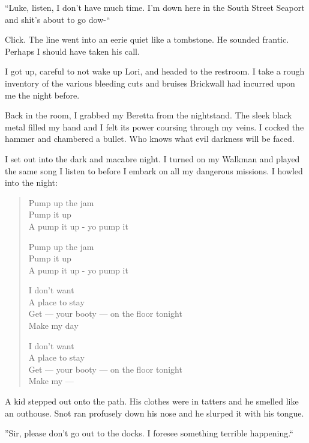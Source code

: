 ``Luke, listen, I don't have much time. I'm down
here in the South Street Seaport and shit's about to go
dow-``



Click. The line went into an eerie quiet like a tombstone. He
sounded frantic. Perhaps I should have taken his call.



I got up, careful to not wake up Lori, and headed to the restroom.
I take a rough inventory of the various bleeding cuts and bruises
Brickwall had incurred upon me the night before.



Back in the room, I grabbed my Beretta from the nightstand. The
sleek black metal filled my hand and I felt its power coursing
through my veins. I cocked the hammer and chambered a bullet. Who
knows what evil darkness will be faced.



I set out into the dark and macabre night. I turned on my Walkman
and played the same song I listen to before I embark on all my
dangerous missions. I howled into the night:



\begin{quote}
Pump up the jam \\
Pump it up \\
A pump it up - yo pump it

Pump up the jam \\
Pump it up \\
A pump it up - yo pump it

I don't want \\
A place to stay \\
Get --- your booty --- on the floor tonight \\
Make my day

I don't want \\
A place to stay \\
Get --- your booty --- on the floor tonight \\
Make my ---
\end{quote}




A kid stepped out onto the path. His clothes were in tatters and he
smelled like an outhouse. Snot ran profusely down his nose and he
slurped it with his tongue.



''Sir, please don't go out to the docks. I foresee something
terrible happening.``



